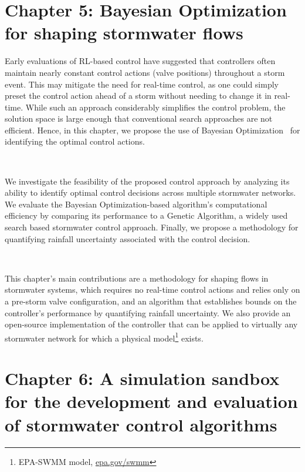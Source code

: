 \section{Chapter 5: Bayesian Optimization for shaping stormwater flows}

Early evaluations of RL-based control have suggested that controllers often maintain nearly constant control actions (valve positions) throughout a storm event.
This may mitigate the need for real-time control, as one could simply preset the control action ahead of a storm without needing to change it in real-time. 
While such an approach considerably simplifies the control problem, the solution space is large enough that conventional search approaches are not efficient.
Hence, in this chapter, we propose the use of Bayesian Optimization~\cite{frazier2018tutorial} for identifying the optimal control actions.

\

We investigate the feasibility of the proposed control approach by analyzing its ability to identify optimal control decisions across multiple stormwater networks.
We evaluate the Bayesian Optimization-based algorithm's computational efficiency by comparing its performance to a Genetic Algorithm, a widely used search based stormwater control approach.
Finally, we propose a methodology for quantifying rainfall uncertainty associated with the control decision. 

\

This chapter's main contributions are a methodology for shaping flows in stormwater systems, which requires no real-time control actions and relies only on a pre-storm valve configuration, and an algorithm that establishes bounds on the controller's performance by quantifying rainfall uncertainty. We also provide an open-source implementation of the controller that can be applied to virtually any stormwater network for which a physical model\footnote{EPA-SWMM model, \href{https://www.epa.gov/water-research/storm-water-management-model-swmm}{epa.gov/swmm}} exists.

\section[Chapter 6: \texttt{pystorms}]{Chapter 6: A simulation sandbox for the development and evaluation of stormwater control algorithms}

